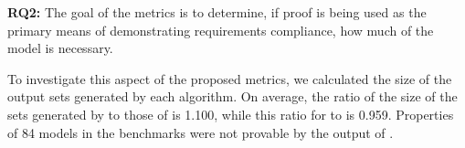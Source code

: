 \textbf{RQ2:} %
The goal of the metrics is to determine, if proof is being used as the primary means of demonstrating requirements compliance, how much of the model is necessary. 

To investigate this aspect of the proposed metrics, we calculated the size of the output sets generated by each algorithm.  %
On average, the ratio of the size of the sets generated by \ucalg to those of \ucbfalg is 1.100,
while this ratio for \mustalg to \ucbfalg is 0.959. Properties of 84 models in the benchmarks were not provable by the output of \mustalg. 



